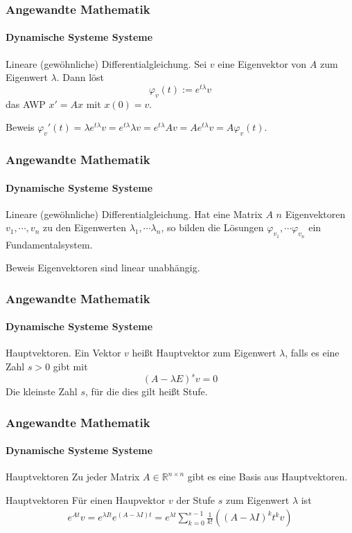 \documentclass{beamer}
\begin{document}
\begin{frame}
    \frametitle{Angewandte Mathematik}
\framesubtitle{Dynamische Systeme Systeme}
\begin{block}{Lineare (gewöhnliche) Differentialgleichung.}
Sei $v$ eine Eigenvektor von $A$ zum Eigenwert $\lambda$. Dann löst 
$$ \varphi_v(t) := e^{t \lambda} v$$ das AWP $x' = Ax$ mit $x(0) = v$.

\end{block}
\begin{block}{Beweis}
$\varphi_v'(t) =  \lambda  e^{t \lambda}  v =  e^{t\lambda}  \lambda v =  e^{t\lambda}  A v  = A e^{t\lambda}   v  = A  \varphi_v(t)$.

\end{block}
 \end{frame}

\begin{frame}
    \frametitle{Angewandte Mathematik}
\framesubtitle{Dynamische Systeme Systeme}
\begin{block}{Lineare (gewöhnliche) Differentialgleichung.}
Hat eine Matrix $A$ $n$ Eigenvektoren $v_1, \cdots , v_n$ zu den Eigenwerten $\lambda_1, \cdots  \lambda_n$, 
so bilden die Lösungen $ \varphi_{v_1}, \cdots  \varphi_{v_n}$ ein Fundamentalsystem.
\end{block}
\begin{block}{Beweis}
Eigenvektoren sind linear unabhängig.
\end{block}
 \end{frame}


\begin{frame}
    \frametitle{Angewandte Mathematik}
\framesubtitle{Dynamische Systeme Systeme}
\begin{block}{Hauptvektoren.}
Ein Vektor $v$ heißt Hauptvektor zum Eigenwert $\lambda$, falls es eine Zahl $s>0$ gibt mit 
$$ (A - \lambda E)^s v = 0$$
Die kleinste Zahl $s$, für die dies gilt heißt Stufe.
\end{block}

 \end{frame}


\begin{frame}
    \frametitle{Angewandte Mathematik}
\framesubtitle{Dynamische Systeme Systeme}
\begin{block}{Hauptvektoren}
Zu jeder Matrix $A \in \mathbb{R}^{n \times n}$ gibt es eine Basis aus Hauptvektoren. 
\end{block}

\begin{block}{Hauptvektoren}
    Für einen Haupvektor $v$ der Stufe $s$ zum Eigenwert $\lambda$ ist
    \begin{align*}
       e^{A t} v = e^{\lambda I t}e^{(A - \lambda I)t} = e^{\lambda t} \sum_{k=0}^{s-1} \frac{1}{k!}((A - \lambda I)^k t^k v)
    \end{align*}
\end{block}

\end{frame}
\end{document}
